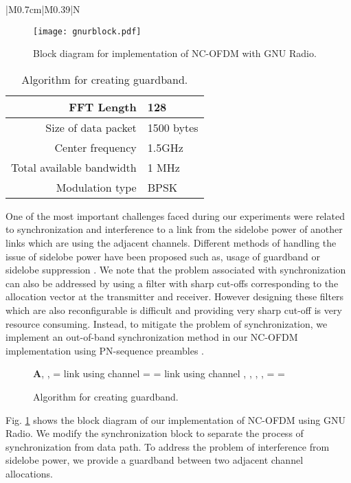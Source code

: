 \documentclass[conference]{IEEEtran}
\newenvironment{boxedalgorithmic}
  {\begin{lrbox}{\ieeealgbox}
   \begin{minipage}{\dimexpr\columnwidth-2\fboxsep-2\fboxrule}
   \begin{algorithmic}}
  {\end{algorithmic}
   \end{minipage}
   \end{lrbox}\noindent\fbox{\usebox{\ieeealgbox}}}
\begin{document}
\begin{table}[b]
\begin{tabular}{|M{0.7cm}|M{0.39\textwidth}|N}
\begin{figure}[!t]
  \centering
    \texttt{[image: gnurblock.pdf]}
    \caption{Block diagram for implementation of NC-OFDM with GNU Radio.}
  \label{fig:gnurblock}
\end{figure}



\begin{table}[t!]
\centering
\caption{Parameters used in experiment}
\begin{tabular}{|r|p{}|}
  \hline
  FFT Length & 128 \\
  \hline
  Size of data packet & 1500 bytes\\
  \hline
  Center frequency & 1.5GHz \\
  \hline
  Total available bandwidth & 1 MHz\\
  \hline
  Modulation type & BPSK \\
  \hline
\end{tabular}
\label{table:expparam}
\end{table}


One of the most important challenges faced during our experiments were related to synchronization and interference to a link from the sidelobe power of another links which are using the adjacent channels. Different methods of handling the issue of sidelobe power have been proposed such as, usage of guardband or sidelobe suppression \cite{dong2009,ghassemi2010,yuan2010}.  We note that the problem associated with synchronization  can also be addressed by using a filter with sharp cut-offs corresponding to the allocation vector at the transmitter and receiver. However designing these filters which are also reconfigurable is difficult and providing very sharp cut-off is very resource consuming. Instead,  to mitigate the  problem of synchronization, we implement an out-of-band synchronization method in our NC-OFDM implementation using PN-sequence preambles \cite{tufve99sync}.
\begin{figure}
\begin{boxedalgorithmic}[1]
 \renewcommand{\algorithmicrequire}{\textbf{Input:}}
 \renewcommand{\algorithmicensure}{\textbf{Output:}}
 \REQUIRE \textbf{A}, , 
 \ENSURE  
\STATE  = link using channel 
  \STATE  =  
  \STATE  = link using channel 
  \IF {()}
  \STATE ,
  \STATE ,
  \ELSE
  \STATE ,
  \STATE ,
  \ENDIF
  \ENDIF
  \STATE  = 
  \STATE  = 
  \ENDFOR
 \RETURN  
 \end{boxedalgorithmic} 
 \caption{Algorithm for creating guardband.}
 \label{fig:algogb}
\end{figure}
Fig. \ref{fig:gnurblock} shows the block diagram of our implementation of NC-OFDM using GNU Radio. We modify the synchronization block to separate the  process of synchronization from data path. To address the problem of interference from sidelobe power, we provide a guardband between two adjacent channel allocations. 



\end{tabular}
\end{table}
\end{document}
